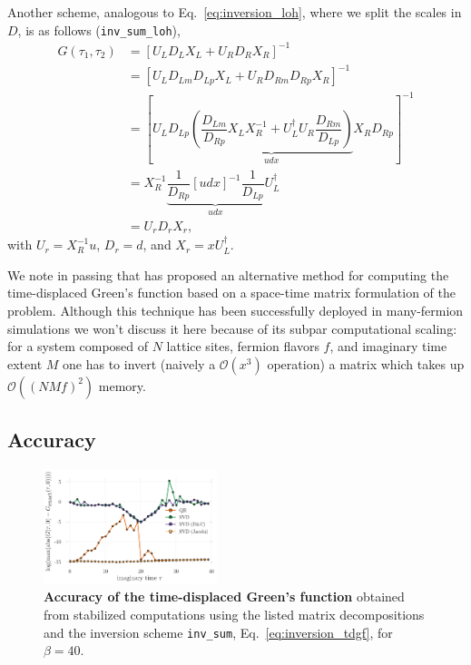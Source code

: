 \documentclass[%
 reprint,
superscriptaddress,
citeautoscript,
showpacs,
 amsmath,amssymb,
 aps,
 prb,
longbibliography,
]{revtex4-2}
\begin{document}
Another scheme, analogous to Eq.~\ref{eq:inversion_loh}, where we split the scales in $D$, is as follows (\texttt{inv\_sum\_loh}), \cite{Loh2005}
\begin{align}
	G(\tau_1, \tau_2) &= [U_L D_L X_L + U_R D_R X_R]^{-1} \nonumber\\
	&= [U_L D_{Lm} D_{Lp} X_L + U_R D_{Rm} D_{Rp} X_R]^{-1} \nonumber\\
	&= \left[U_L D_{Lp} \underbrace{\left( \dfrac{D_{Lm}}{D_{Rp}} X_L X_R^{-1} + U_L^\dagger U_R \dfrac{D_{Rm}}{D_{Lp}} \right)}_{udx} X_R D_{Rp} \right]^{-1} \nonumber\\
	&= X_R^{-1} \underbrace{\dfrac{1}{D_{Rp}} [udx]^{-1} \dfrac{1}{D_{Lp}}}_{udx} U_L^\dagger \label{eq:inversion_tdgf_loh} \\
	&= U_r D_r X_r, \nonumber
\end{align}
with $U_r = X_R^{-1} u$, $D_r = d$, and $X_r = x U_L^\dagger$.

We note in passing that \citet{Hirsch1988} has proposed an alternative method for computing the time-displaced Green's function based on a space-time matrix formulation of the problem. Although this technique has been successfully deployed in many-fermion simulations we won't discuss it here because of its subpar computational scaling: for a system composed of $N$ lattice sites, fermion flavors $f$, and imaginary time extent $M$ one has to invert (naively a $\mathcal{O}(x^3)$ operation) a matrix which takes up $\mathcal{O}((NMf)^2)$ memory.

\subsection{Accuracy}

\begin{figure}
	\includegraphics[width=0.45\textwidth]{figures/accuracy_tdgf.pdf}
	\caption{\textbf{Accuracy of the time-displaced Green's function} obtained from stabilized computations using the listed matrix decompositions and the inversion scheme \texttt{inv\_sum}, Eq.~\eqref{eq:inversion_tdgf}, for $\beta = 40$. \label{fig:tdgf_accuracy_regularinv}}
\end{figure}
\end{document}
